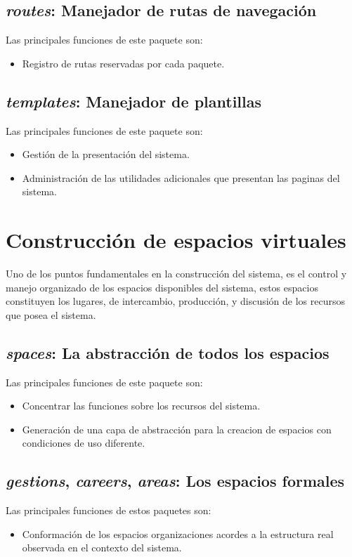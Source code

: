 \subsection{\emph{routes}: Manejador de rutas de navegación}
Las principales funciones de este paquete son:
\begin{itemize}
\item Registro de rutas reservadas por cada paquete.
\end{itemize}

\subsection{\emph{templates}: Manejador de plantillas}
Las principales funciones de este paquete son:
\begin{itemize}
\item Gestión de la presentación del sistema.
\item Administración de las utilidades adicionales que presentan las paginas
del sistema.
\end{itemize}

\section{Construcción de espacios virtuales}
Uno de los puntos fundamentales en la construcción del sistema, es el control y
manejo organizado de los espacios disponibles del sistema, estos espacios
constituyen los lugares, de intercambio, producción, y discusión de los
recursos que posea el sistema.

\subsection{\emph{spaces}: La abstracción de todos los espacios}
Las principales funciones de este paquete son:
\begin{itemize}
\item Concentrar las funciones sobre los recursos del sistema.
\item Generación de una capa de abstracción para la creacion de espacios con
condiciones de uso diferente.
\end{itemize}

\subsection{\emph{gestions}, \emph{careers}, \emph{areas}: Los espacios
formales}
Las principales funciones de estos paquetes son:
\begin{itemize}
\item Conformación de los espacios organizaciones acordes a la estructura real
observada en el contexto del sistema.
\end{itemize}

